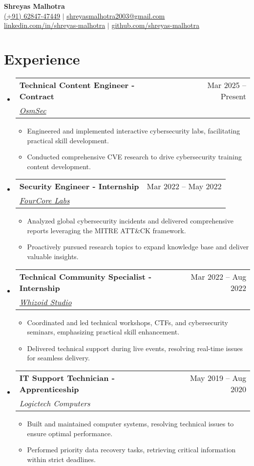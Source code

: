 \documentclass[letterpaper,12pt]{article}
\newcommand{\resumeItem}[1]{
  \item[--]\small{#1} %
}
\newcommand{\resumeSubheading}[4]{
  \item \vspace{1pt}
    \begin{tabularx}{\textwidth}{Xr}
      \textbf{#1} & #2 \\
      \textit{\small#3} & \textit{\small #4} \\
    \end{tabularx} \vspace{1pt}
}
\newcommand{\resumeItemListStart}{\begin{itemize}[topsep=1pt, itemsep=1pt, leftmargin=0.2in]}
\newcommand{\resumeItemListEnd}{\end{itemize} \vspace{1pt}}
\newcommand{\resumeSubHeadingListStart}{\begin{itemize}[leftmargin=0.15in, label={}, topsep=2pt]}
\newcommand{\resumeSubHeadingListEnd}{\end{itemize}}
\begin{document}

\begin{center}
    \textbf{\Huge Shreyas Malhotra} \\ \vspace{4pt}
    \small \href{tel:+916284747449}{\underline{(+91) 62847-47449}} $|$ \small \href{mailto:shreyasmalhotra2003@gmail.com}{\underline{shreyasmalhotra2003@gmail.com}} \\
    \small \href{https://linkedin.com/in/shreyas-malhotra}{\underline{linkedin.com/in/shreyas-malhotra}} $|$
    \small \href{https://github.com/shreyas-malhotra}{\underline{github.com/shreyas-malhotra}}
\end{center}


\section{Experience}
  \resumeSubHeadingListStart
    \resumeSubheading
      {Technical Content Engineer - Contract}{Mar 2025 -- Present}
      {\href{https://osmsec.xyz}{OsmSec}}{}
      \resumeItemListStart
        \resumeItem{Engineered and implemented interactive cybersecurity labs, facilitating practical skill development.}
        \resumeItem{Conducted comprehensive CVE research to drive cybersecurity training content development.}
      \resumeItemListEnd
    
    \resumeSubheading
      {Security Engineer - Internship}{Mar 2022 -- May 2022}
      {\href{https://fourcore.io}{FourCore Labs}}{}
      \resumeItemListStart
        \resumeItem{Analyzed global cybersecurity incidents and delivered comprehensive reports leveraging the MITRE ATT\&CK framework.}
        \resumeItem{Proactively pursued research topics to expand knowledge base and deliver valuable insights.}
      \resumeItemListEnd

    \resumeSubheading
      {Technical Community Specialist - Internship}{Mar 2022 -- Aug 2022}
      {\href{https://whizoid.com}{Whizoid Studio}}{}
      \resumeItemListStart
        \resumeItem{Coordinated and led technical workshops, CTFs, and cybersecurity seminars, emphasizing practical skill enhancement.}
        \resumeItem{Delivered technical support during live events, resolving real-time issues for seamless delivery.}
      \resumeItemListEnd

    \resumeSubheading
      {IT Support Technician - Apprenticeship}{May 2019 -- Aug 2020}
      {Logictech Computers}{}
      \resumeItemListStart
        \resumeItem{Built and maintained computer systems, resolving technical issues to ensure optimal performance.}
        \resumeItem{Performed priority data recovery tasks, retrieving critical information within strict deadlines.}
      \resumeItemListEnd
  \resumeSubHeadingListEnd
\end{document}
